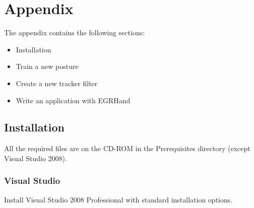 % 

\chapter*{Appendix}

The appendix contains the following sections:
\begin{itemize}
\item Installation
\item Train a new posture
\item Create a new tracker filter
\item Write an application with EGRHand
\end{itemize}

\section*{Installation}
All the required files are on the CD-ROM in the Prerequisites directory (except Visual Studio 2008).
\subsection*{Visual Studio}
Install Visual Studio 2008 Professional with standard installation options.

